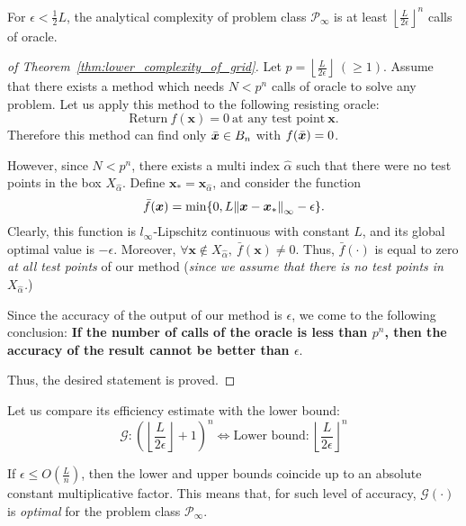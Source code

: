 \begin{thm}\label{thm:lower_complexity_of_grid}
    For \(\epsilon < \frac{1}{2}L\), the analytical complexity of problem class \(\mathscr{P}_\infty\) is at least \(\left\lfloor \frac{L}{2\epsilon} \right\rfloor^n\) calls of oracle.
\end{thm}

\begin{proof}[of Theorem~\ref{thm:lower_complexity_of_grid}]
    Let \(p = \left\lfloor \frac{L}{2\epsilon} \right\rfloor~(\ge 1)\). Assume that there exists a method which needs \(N < p^n\) calls of oracle to solve any problem. Let us apply this method to the following resisting oracle:
    \[
        \text{Return} ~ f(\bm{x}) = 0 ~ \text{at any test point} ~  \bm{x}.
    \]
    Therefore this method can find only \(\bar{\bm{x}} \in B_n\) with \(f(\bar{\bm{x}}) = 0\).

    However, since \(N < p^n\), there exists a multi index \(\hat{\alpha}\) such that there were no test points in the box \(X_{\hat{\alpha}}\). Define \(\bm{x}_* = \bm{x}_{\hat{\alpha}}\), and consider the function
    \[
        \bar{f}(\bm{x}) = \min \{ 0, L\norm{\bm{x} - \bm{x}_*}_{\infty} - \epsilon \}.  
    \]
    Clearly, this function is \(l_\infty\)-Lipschitz continuous with constant \(L\), and its global optimal value is \(-\epsilon\).
    Moreover, \(\forall \bm{x} \notin X_{\hat{\alpha}},~\bar{f}(\bm{x}) \ne 0\). Thus, \(\bar{f}(\cdot)\) is equal to zero \emph{at all test points} of our 
    method (\emph{since we assume that there is no test points in \(X_{\hat{\alpha}}\).})

    Since the accuracy of the output of our method is \(\epsilon\), we come to the following conclusion: \textbf{If the number of calls of the oracle is less than \(p^n\), then the accuracy of the result cannot be better than \(\epsilon\)}.

    Thus, the desired statement is proved.
\end{proof}

\begin{thm}\label{thm:upper_lower_bounds}
    Let us compare its efficiency estimate with the lower bound:
    \[
        \mathscr{G}: \left(\left\lfloor \frac{L}{2\epsilon} \right\rfloor + 1\right)^n \Leftrightarrow \text{Lower bound:}~\left\lfloor \frac{L}{2\epsilon} \right\rfloor^n
    \]

    If \(\epsilon \le O\left( \frac{L}{n} \right)\), then the lower and upper bounds coincide up to an absolute constant multiplicative factor. This means that, for such level of accuracy,
    \(\mathscr{G}(\cdot)\) is \emph{optimal} for the problem class \(\mathscr{P}_\infty\).
\end{thm}

